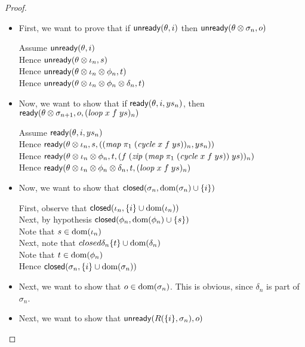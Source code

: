 \begin{proof}
  \begin{itemize}
  \item First, we want to prove that if $\mathsf{unready}({\theta}, {i})$ then $\mathsf{unready}({\theta \otimes \sigma_n}, {o})$ 

    \begin{tabbedproof}
      \oo Assume $\mathsf{unready}({\theta}, {i})$ \\
      \oo Hence $\mathsf{unready}({\theta \otimes \iota_n}, {s})$ \\
      \oo Hence $\mathsf{unready}({\theta \otimes \iota_n \otimes \phi_n}, {t})$ \\
      \oo Hence $\mathsf{unready}({\theta \otimes \iota_n \otimes \phi_n \otimes \delta_n}, {t})$ \\
    \end{tabbedproof}

  \item Now, we want to show that if $\mathsf{ready}({\theta}, {i}, {ys_n})$, then $\mathsf{ready}({\theta \otimes \sigma_{n+1}}, {o}, {(\mathit{loop}\;x\;f\;ys)_n})$ 
    \begin{tabbedproof}
      \oo Assume $\mathsf{ready}({\theta}, {i}, {ys_n})$ \\
      \oo Hence $\mathsf{ready}({\theta \otimes \iota_n}, {s}, {((\mathit{map}\;\pi_1\;(\mathit{cycle}\;x\;f\;ys))_n, ys_n)})$ \\
      \oo Hence $\mathsf{ready}({\theta \otimes \iota_n \otimes \phi_n}, {t}, {(f\;(\mathit{zip}\;(\mathit{map}\;\pi_1\;(\mathit{cycle}\;x\;f\;ys))\;ys))_n})$ \\
      \oo Hence $\mathsf{ready}({\theta \otimes \iota_n \otimes \phi_n \otimes \delta_n}, {t}, {(\mathit{loop}\;x\;f\;ys)_n})$ \\
    \end{tabbedproof}

  \item Now, we want to show that $\mathsf{closed}({\sigma_n}, {\mbox{dom}({\sigma_n}) \cup \{{i}\}})$ 

    \begin{tabbedproof}
      \oo First, observe that $\mathsf{closed}({\iota_n}, {\{{i}\} \cup \mbox{dom}({\iota_n})})$\\
      \oo Next, by hypothesis $\mathsf{closed}({\phi_n}, {\mbox{dom}({\phi_n}) \cup \{{s}\}})$ \\
      \oo Note that $s \in \mbox{dom}({\iota_n})$ \\
      \oo Next, note that $closed{\delta_n}{\{{t}\} \cup \mbox{dom}({\delta_n})}$ \\
      \oo Note that $t \in \mbox{dom}({\phi_n})$ \\
      \oo Hence $\mathsf{closed}({\sigma_n}, {\{{i}\} \cup \mbox{dom}({\sigma_n})})$
    \end{tabbedproof}
  \item Next, we want to show that $o \in \mbox{dom}({\sigma_n})$. This is obvious, since $\delta_n$ is part 
    of $\sigma_n$. 
  \item Next, we want to show that $\mathsf{unready}({R(\{{i}\}, \sigma_n)}, {o})$
    

\end{itemize}
\end{proof}
